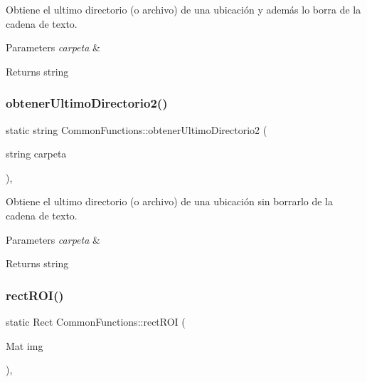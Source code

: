 Obtiene el ultimo directorio (o archivo) de una ubicación y además lo borra de la cadena de texto. 


\begin{DoxyParams}{Parameters}
{\em carpeta} & \\
\hline
\end{DoxyParams}
\begin{DoxyReturn}{Returns}
string 
\end{DoxyReturn}
\mbox{\label{classCommonFunctions_af27fbe7fc5de24747ddf5a0496016301}} 
\subsubsection{\texorpdfstring{obtener\+Ultimo\+Directorio2()}{obtenerUltimoDirectorio2()}}
{\footnotesize\ttfamily static string Common\+Functions\+::obtener\+Ultimo\+Directorio2 (\begin{DoxyParamCaption}\item[{string}]{carpeta }\end{DoxyParamCaption})\hspace{0.3cm}{\ttfamily [inline]}, {\ttfamily [static]}}



Obtiene el ultimo directorio (o archivo) de una ubicación sin borrarlo de la cadena de texto. 


\begin{DoxyParams}{Parameters}
{\em carpeta} & \\
\hline
\end{DoxyParams}
\begin{DoxyReturn}{Returns}
string 
\end{DoxyReturn}
\mbox{\label{classCommonFunctions_aaa36dbe5e5b5be0caf0af58306f333bf}} 
\subsubsection{\texorpdfstring{rect\+R\+O\+I()}{rectROI()}}
{\footnotesize\ttfamily static Rect Common\+Functions\+::rect\+R\+OI (\begin{DoxyParamCaption}\item[{Mat}]{img }\end{DoxyParamCaption})\hspace{0.3cm}{\ttfamily [inline]}, {\ttfamily [static]}}



